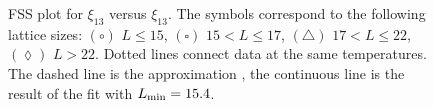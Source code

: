 \documentclass[12pt]{article}
\newcommand{\text}{\rm}
\begin{document}



\begin{figure}
\vspace*{-2.0truecm}
\begin{center}
\end{center}
\vspace*{-1.5truecm}
\caption{FSS plot for $\xi_{13}$ versus $\xi_{13}$. 
The symbols correspond to the 
following lattice sizes: $(\circ)$ $ L\le 15$, $( \square )$ $ 15 < L \le 17$,
$(\triangle)$ $ 17 < L \le 22$, $(\lozenge)$ $ L > 22$. 
Dotted lines connect data at the same temperatures.
The dashed line is the 
approximation , the continuous line is the 
result of the fit with $L_{\rm min} = 15.4$.}
\label{fig:fssplot_xi13}
\end{figure}                                                                    
\end{document}
